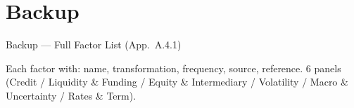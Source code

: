 \documentclass[aspectratio=169,11pt]{beamer}
\newcommand{\tablepath}{../results/tables}
\begin{document}
\section{Backup}

\begin{frame}[allowframebreaks]{Backup --- Full Factor List (App.\ A.4.1)}
\centering
\footnotesize



\vspace{0.20cm}

{\footnotesize
Each factor with: name, transformation, frequency, source, reference.
6 panels (Credit / Liquidity \& Funding / Equity \& Intermediary / Volatility / Macro \& Uncertainty / Rates \& Term).}

\end{frame}
\end{document}
